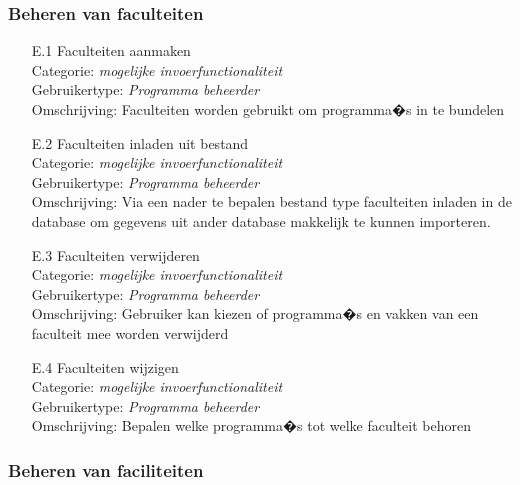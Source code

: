 \documentclass{article}
\begin{document}
\subsubsection{Beheren van faculteiten}

\begin{itemize}
\item[E.1] Faculteiten aanmaken \\
Categorie: \textit{mogelijke invoerfunctionaliteit }\\
Gebruikertype: \textit{Programma beheerder} \\
Omschrijving: Faculteiten worden gebruikt om programma�s in te bundelen \\[-3mm]

\item[E.2] Faculteiten inladen uit bestand  \\
Categorie: \textit{mogelijke invoerfunctionaliteit} \\
Gebruikertype: \textit{Programma beheerder} \\
Omschrijving: Via een nader te bepalen bestand type faculteiten inladen in de database om gegevens uit ander database makkelijk te kunnen importeren. \\[-3mm]

\item[E.3] Faculteiten verwijderen \\
Categorie: \textit{mogelijke invoerfunctionaliteit} \\
Gebruikertype: \textit{Programma beheerder }\\
Omschrijving: Gebruiker kan kiezen of programma�s en vakken van een faculteit mee worden verwijderd \\[-3mm]

\item[E.4] Faculteiten wijzigen \\
Categorie: \textit{mogelijke invoerfunctionaliteit} \\
Gebruikertype: \textit{Programma beheerder }\\
Omschrijving: Bepalen welke programma�s tot welke faculteit behoren \\[-3mm]
\end{itemize}

\subsubsection{Beheren van faciliteiten}
\end{document}
